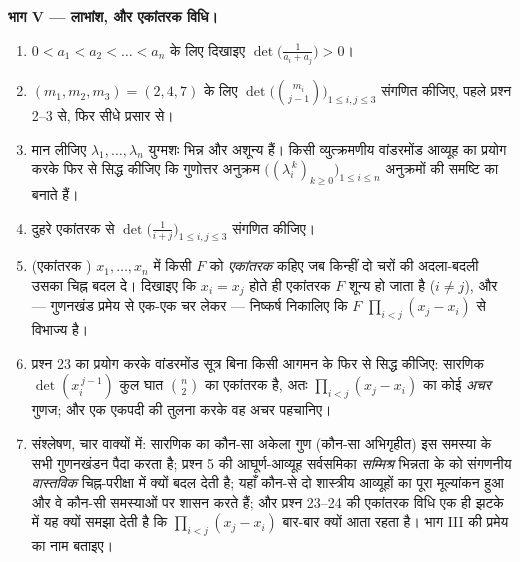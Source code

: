 \begin{problem}
\medskip \noindent\textbf{भाग V --- लाभांश, और एकांतरक विधि।}
\begin{enumerate}[resume]
  \item $0 < a_1 < a_2 < \dots < a_n$ के लिए दिखाइए $\det\bigl(\frac{1}{a_i
  + a_j}\bigr) > 0$।
  \item $(m_1, m_2, m_3) = (2, 4, 7)$ के लिए
  $\det\bigl(\binom{m_i}{j-1}\bigr)_{1 \leq i, j \leq 3}$ संगणित कीजिए, पहले
  प्रश्न 2--3 से, फिर सीधे प्रसार से।
  \item मान लीजिए $\lambda_1, \dots, \lambda_n$ युग्मशः भिन्न और अशून्य हैं।
  किसी व्युत्क्रमणीय वांडरमोंड आव्यूह का प्रयोग करके फिर से सिद्ध कीजिए कि
  गुणोत्तर अनुक्रम $\bigl((\lambda_i^{\,k})_{k \geq 0}\bigr)_{1 \leq i \leq
  n}$ अनुक्रमों की समष्टि का  बनाते हैं।
  \item दुहरे एकांतरक से $\det\bigl(\frac{1}{i + j}\bigr)_{1 \leq i, j \leq
  3}$ संगणित कीजिए।
  \item (एकांतरक ) $x_1, \dots, x_n$ में किसी  $F$ को
  \emph{एकांतरक} कहिए जब किन्हीं दो चरों की अदला-बदली उसका चिह्न बदल दे।
  दिखाइए कि $x_i = x_j$ होते ही एकांतरक $F$ शून्य हो जाता है ($i \neq j$),
  और --- गुणनखंड प्रमेय से एक-एक चर लेकर --- निष्कर्ष निकालिए कि $F$
  $\prod_{i<j}(x_j - x_i)$ से विभाज्य है।
  \item प्रश्न 23 का प्रयोग करके वांडरमोंड सूत्र बिना किसी आगमन के फिर से
  सिद्ध कीजिए: सारणिक $\det(x_i^{\,j-1})$ कुल घात $\binom n2$ का एकांतरक
   है, अतः $\prod_{i<j}(x_j - x_i)$ का कोई \emph{अचर} गुणज; और एक एकपदी
  की तुलना करके वह अचर पहचानिए।
  \item संश्लेषण, चार वाक्यों में: सारणिक का कौन-सा अकेला गुण (कौन-सा
  अभिगृहीत) इस समस्या के सभी गुणनखंडन पैदा करता है; प्रश्न 5 की
  आघूर्ण-आव्यूह सर्वसमिका \emph{सम्मिश्र} भिन्नता के  को संगणनीय
  \emph{वास्तविक} चिह्न-परीक्षा में क्यों बदल देती है; यहाँ कौन-से दो
  शास्त्रीय आव्यूहों का पूरा मूल्यांकन हुआ और वे कौन-सी  समस्याओं पर
  शासन करते हैं; और प्रश्न 23--24 की एकांतरक विधि एक ही झटके में यह क्यों
  समझा देती है कि $\prod_{i<j}(x_j - x_i)$ बार-बार क्यों आता रहता है। भाग
  III की प्रमेय का नाम बताइए।
\end{enumerate}
\end{problem}

